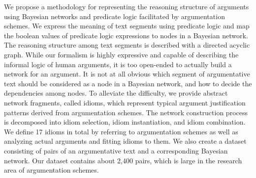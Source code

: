We propose a methodology for representing the reasoning structure of arguments using Bayesian networks and predicate logic facilitated by argumentation schemes. We express the meaning of text segments using predicate logic and map the boolean values of predicate logic expressions to nodes in a Bayesian network. The reasoning structure among text segments is described with a directed acyclic graph. While our formalism is highly expressive and capable of describing the informal logic of human arguments, it is too open-ended to actually build a network for an argument. It is not at all obvious which segment of argumentative text should be considered as a node in a Bayesian network, and how to decide the dependencies among nodes. To alleviate the difficulty, we provide abstract network fragments, called idioms, which represent typical argument justification patterns derived from argumentation schemes. The network construction process is decomposed into idiom selection, idiom instantiation, and idiom combination. We define 17 idioms in total by referring to argumentation schemes as well as analyzing actual arguments and fitting idioms to them. We also create a dataset consisting of pairs of an argumentative text and a corresponding Bayesian network. Our dataset contains about 2,400 pairs, which is large in the research area of argumentation schemes.
